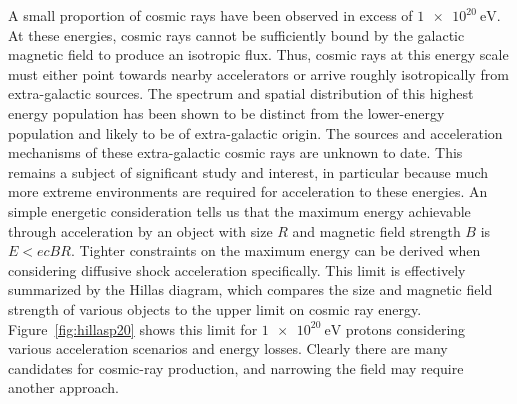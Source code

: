 A small proportion of cosmic rays have been observed in excess of $\SI{1e20}\eV$.
At these energies, cosmic rays cannot be sufficiently bound by the galactic magnetic field to produce an isotropic flux.
Thus, cosmic rays at this energy scale must either point towards nearby accelerators or arrive roughly isotropically from extra-galactic sources.
The spectrum and spatial distribution of this highest energy population has been shown to be distinct from the lower-energy population and likely to be of extra-galactic origin.
The sources and acceleration mechanisms of these extra-galactic cosmic rays are unknown to date.
This remains a subject of significant study and interest, in particular because much more extreme environments are required for acceleration to these energies.
An simple energetic consideration tells us that the maximum energy achievable through acceleration by an object with size $R$ and magnetic field strength $B$ is $E<ecBR$.
Tighter constraints on the maximum energy can be derived when considering diffusive shock acceleration specifically.
This limit is effectively summarized by the Hillas diagram, which compares the size and magnetic field strength of various objects to the upper limit on cosmic ray energy.
Figure~\ref{fig:hillasp20} shows this limit for $\SI{1e20}\eV$ protons considering various acceleration scenarios and energy losses.
Clearly there are many candidates for cosmic-ray production, and narrowing the field may require another approach.

